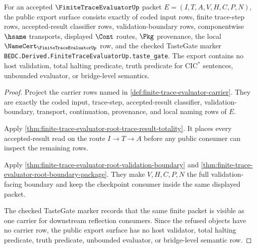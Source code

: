 \begin{theorem}
\label{thm:finite-trace-evaluator-public-root-export}
For an accepted $\FiniteTraceEvaluatorUp$ packet $E=(I,T,A,V,H,C,P,N)$, the
public export surface consists exactly of coded input rows, finite trace-step
rows, accepted-result classifier rows, validation-boundary rows, componentwise
$\hsame$ transports, displayed $\Cont$ routes, $\Pkg$ provenance, the local
$\NameCert_{\FiniteTraceEvaluatorUp}$ row, and the checked TasteGate marker
\texttt{BEDC.Derived.FiniteTraceEvaluatorUp.taste\_gate}. The export contains
no host validation, total halting predicate, truth predicate for
$\mathrm{CIC}^{*}$ sentences, unbounded evaluator, or bridge-level semantics.
\end{theorem}
\begin{proof}
Project the carrier rows named in \autoref{def:finite-trace-evaluator-carrier}.
They are exactly the coded input, trace-step, accepted-result classifier,
validation-boundary, transport, continuation, provenance, and local naming rows
of $E$.

Apply \autoref{thm:finite-trace-evaluator-root-trace-result-totality}. It
places every accepted-result read on the route $I \to T \to A$ before any
public consumer can inspect the remaining rows.

Apply \autoref{thm:finite-trace-evaluator-root-validation-boundary} and
\autoref{thm:finite-trace-evaluator-root-boundary-package}. They make
$V,H,C,P,N$ the full validation-facing boundary and keep the checkpoint
consumer inside the same displayed packet.

The checked TasteGate marker records that the same finite packet is visible as
one carrier for downstream reflection consumers. Since the refused objects have
no carrier row, the public export surface has no host validator, total halting
predicate, truth predicate, unbounded evaluator, or bridge-level semantic row.
\end{proof}


